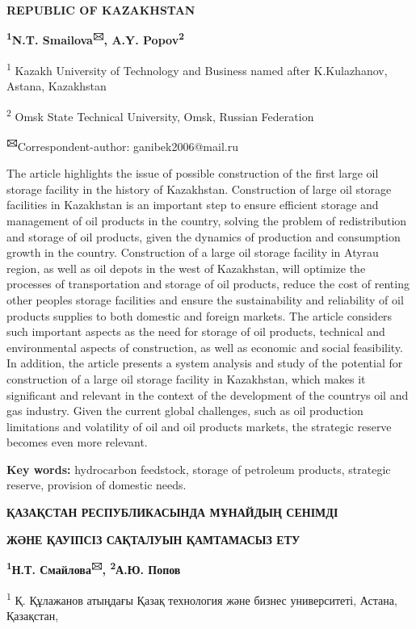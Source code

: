 {\bfseries REPUBLIC OF KAZAKHSTAN}

{\bfseries \textsuperscript{1}N.T. Smailova\textsuperscript{🖂}, A.Y.
Popov\textsuperscript{2}}

\textsuperscript{1} Kazakh University of Technology and Business named
after K.Kulazhanov, Astana, Kazakhstan

\textsuperscript{2} Omsk State Technical University, Omsk, Russian
Federation

{\bfseries \textsuperscript{🖂}}Correspondent-author: ganibek2006@mail.ru

The article highlights the issue of possible construction of the first
large oil storage facility in the history of Kazakhstan. Construction of
large oil storage facilities in Kazakhstan is an important step to
ensure efficient storage and management of oil products in the country,
solving the problem of redistribution and storage of oil products, given
the dynamics of production and consumption growth in the country.
Construction of a large oil storage facility in Atyrau region, as well
as oil depots in the west of Kazakhstan, will optimize the processes of
transportation and storage of oil products, reduce the cost of renting
other people\textquotesingle s storage facilities and ensure the
sustainability and reliability of oil products supplies to both domestic
and foreign markets. The article considers such important aspects as the
need for storage of oil products, technical and environmental aspects of
construction, as well as economic and social feasibility. In addition,
the article presents a system analysis and study of the potential for
construction of a large oil storage facility in Kazakhstan, which makes
it significant and relevant in the context of the development of the
country\textquotesingle s oil and gas industry. Given the current global
challenges, such as oil production limitations and volatility of oil and
oil products markets, the strategic reserve becomes even more relevant.

{\bfseries Key words:} hydrocarbon feedstock, storage of petroleum
products, strategic reserve, provision of domestic needs.

{\bfseries ҚАЗАҚСТАН РЕСПУБЛИКАСЫНДА МҰНАЙДЫҢ СЕНІМДІ}

{\bfseries ЖӘНЕ ҚАУІПСІЗ САҚТАЛУЫН ҚАМТАМАСЫЗ ЕТУ}

{\bfseries \textsuperscript{1}Н.Т. Смайлова\textsuperscript{🖂},
\textsuperscript{2}А.Ю. Попов}

\textsuperscript{1} Қ. Құлажанов атыңдағы Қазақ технология және бизнес
университеті, Астана, Қазақстан,

